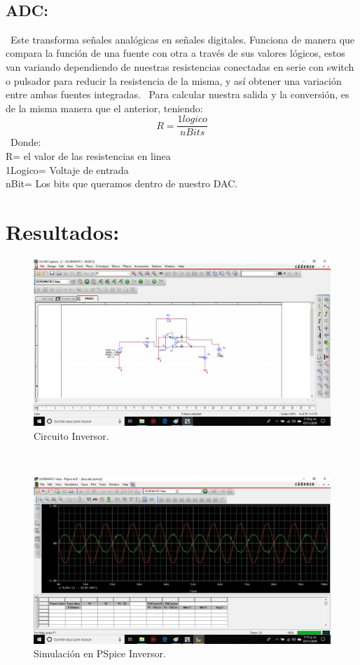 \documentclass[14pt,letterpaper]{article}
\begin{document}
\
\subsection{ADC:}
\
Este transforma señales analógicas en señales digitales. Funciona de manera que compara la función de una fuente con otra a través de sus valores lógicos, estos van variando dependiendo de nuestras resistencias conectadas en serie con switch o pulsador para reducir la resistencia de la misma, y así obtener una variación entre ambas fuentes integradas.
\
Para calcular nuestra salida y la conversión, es de la misma manera que el anterior, teniendo:
$$R=\frac{1logico}{nBits}$$
\
Donde:
\\R= el valor de las resistencias en linea
\\1Logico= Voltaje de entrada
\\nBit= Los bits que queramos dentro de nuestro DAC.
\newpage
\section{Resultados:}

\begin{figure}[h!]
\begin{center}
\includegraphics[scale=0.5]{Simulacion-PCB/inversor.png} 
\caption{Circuito Inversor.}
\end{center}
\end{figure}

\
\begin{figure}[h!]
\begin{center}
\includegraphics[scale=0.5]{Simulacion-PCB/siminversor.png} 
\caption{Simulación en PSpice Inversor.}
\end{center}
\end{figure}
\end{document}
